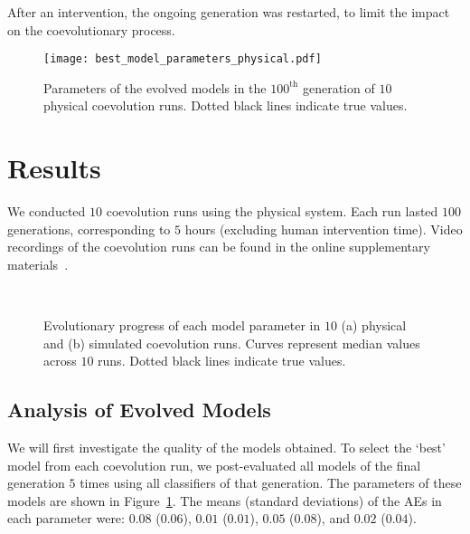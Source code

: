 After an intervention, the ongoing generation was restarted, to limit the impact on the coevolutionary process.

\begin{figure}[!t]
    \centering
    \texttt{[image: best\_model\_parameters\_physical.pdf]}
    \caption{Parameters of the evolved models in the $100^{\textrm{th}}$ generation of $10$ physical coevolution runs. Dotted black lines indicate true values.}
    \label{fig:best_model_parameters_physical}
\end{figure}
%
\section{Results}\label{sec:experimental_results_swarm_physical}

We conducted $10$ coevolution runs using the physical system. Each run lasted $100$ generations, corresponding to $5$ hours (excluding human intervention time). Video recordings of the coevolution runs can be found in the online supplementary materials~\cite{online_supplementary_material_tevc2014}.

\begin{figure}[!t]%
	\centering
		\\
		\caption{Evolutionary progress of each model parameter in $10$ (a) physical and (b) simulated coevolution runs. Curves represent median values across $10$ runs. Dotted black lines indicate true values.}
		\label{fig:model_parameters_convergence_compare}
\end{figure}

\subsection{Analysis of Evolved Models}\label{sec:analysis_evolved_model_physical_swarm}

We will first investigate the quality of the models obtained. To select the `best' model from each coevolution run, we post-evaluated all models of the final generation $5$ times using all classifiers of that generation. The parameters of these models are shown in Figure~\ref{fig:best_model_parameters_physical}. The means (standard deviations) of the AEs in each parameter were: $0.08$ ($0.06$), $0.01$ ($0.01$), $0.05$ ($0.08$), and $0.02$ ($0.04$).

